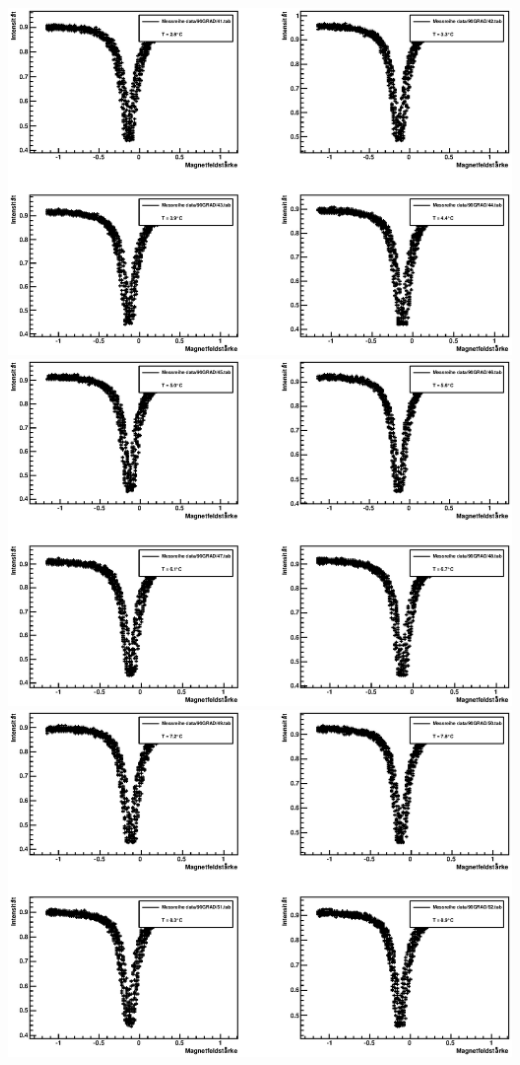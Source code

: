 \documentclass[12pt]{article}
\begin{document}
\includegraphics[width=1\linewidth]{pictures/7.eps} \\
\includegraphics[width=1\linewidth]{pictures/8.eps} \\
\includegraphics[width=1\linewidth]{pictures/9.eps} \\
\end{document}
